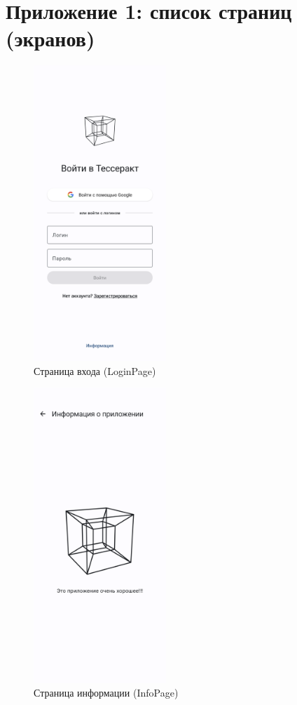 \documentclass[a4paper, 14pt]{article}
\begin{document}
\newpage
\section{Приложение 1: список страниц (экранов)}

\begin{figure}[H]
    \centering
    \includegraphics[width=5cm]{resources/4.png}
    \caption{Страница входа (LoginPage)}
\end{figure}

\begin{figure}[H]
    \centering
    \includegraphics[width=5cm]{resources/5.png}
    \caption{Страница информации (InfoPage)}
\end{figure}
\end{document}
